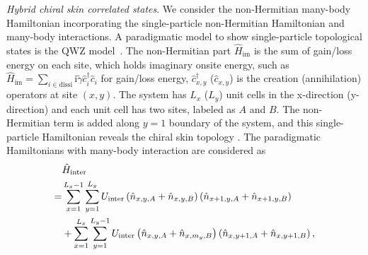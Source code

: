 \documentclass[longbibliography, aps, prx, amsmath, amssymb, amsfonts, twocolumn,superscriptaddress, footinbib]{revtex4-1}
\begin{document}
	\textit{Hybrid chiral skin correlated states}. We consider the non-Hermitian many-body Hamiltonian incorporating the single-particle non-Hermitian Hamiltonian and many-body interactions. 
	A paradigmatic model to show single-particle topological states is the QWZ model~\cite{qi2006topological}. The non-Hermitian part $\hat{H}_{\text{im}}$ is the sum of gain/loss energy on each site, which holds imaginary onsite energy, such as $\hat{H}_{\text{im}} = \sum_{i\in \text{dissi}} \mathrm{i}\tilde{\gamma} \hat{c}_i^{\dagger} \hat{c}_i$ for gain/loss energy, $\hat{c}_{{x}, {y}}^{\dagger}$ ($\hat{c}_{{x}, {y}}$) is the creation (annihilation) operators at site $({x},{y})$.  The system has $L_x$ ($L_y$) unit cells in the x-direction (y-direction) and each unit cell has two sites, labeled as $A$ and $B$. The non-Hermitian term is added along $y=1$ boundary of the system, and this single-particle Hamiltonian reveals the chiral skin topology \cite{nakamura2023universal, ma2024non, schindler2023hermitian}.
    The paradigmatic Hamiltonians with many-body interaction are considered as
		\begin{align}
			&\hat{H}_{\text{inter}} \notag\\= &\sum_{{x}=1}^{L_{x}-1} \sum_{{y}=1}^{L_{y}}  U_{\text{inter}} \left(\hat{n}_{{x}, {y}, A}+\hat{n}_{{x}, {y}, B}\right) \left(\hat{n}_{{x}+1, {y}, A}+\hat{n}_{{x}+1, {y}, B}\right)\notag\\
			& + 
			\sum_{{x}=1}^{L_{x}} \sum_{{y}=1}^{L_{y}-1}  U_{\text{inter}} \left(\hat{n}_{{x}, {y}, A}+\hat{n}_{{x}, m_y, B}\right) \left(\hat{n}_{{x}, {y}+1, A}+\hat{n}_{{x}, {y}+1, B}\right), \label{eq:inter_cell}
		\end{align}
\end{document}
